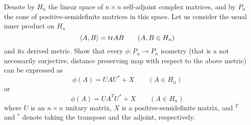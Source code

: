Denote by $ H_n$ the linear space of $ n\times n$ self-adjoint complex matrices, and by $ P_n$ the cone of positive-semidefinite matrices in this space. Let us consider the usual inner product on $ H_n$
\[ \langle A,B\rangle = {\rm tr} AB\qquad (A,B\in H_n)\]
and its derived metric. Show that every $ \phi: P_n\to P_n$ isometry (that is a not necessarily surjective, distance preserving map with respect to the above metric) can be expressed as
\[ \phi(A) = UAU^* + X\qquad (A\in H_n)\]
or
\[ \phi(A) = UA^TU^* + X\qquad (A\in H_n)\]
where $ U$ is an $ n\times n$ unitary matrix, $ X$ is a positive-semidefinite matrix, and $ ^T$ and $ ^*$ denote taking the transpose and the adjoint, respectively.